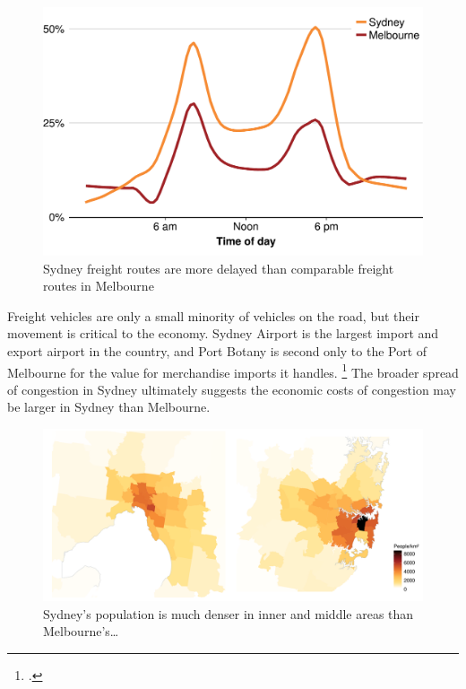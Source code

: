 \documentclass{grattan}
\begin{document}
\begin{figure}
\caption{Sydney freight routes are more delayed than comparable freight routes in Melbourne\label{fig:freight-routes-syd-and-melb}}
\includegraphics{atlas/increase_in_travel_time-vs-time_of_day-by-City--Freight-1.pdf}
\end{figure}

Freight vehicles are only a small minority of vehicles on the road, but their movement is critical to the economy. Sydney Airport is the largest import and export airport in the country, and Port Botany is second only to the Port of Melbourne for the value for merchandise imports it handles.%
   \footcite[][6]{BITRE-2014-Freightline}
The broader spread of congestion in Sydney ultimately suggests the economic costs of congestion may be larger in Sydney than Melbourne.


\begin{figure}
\caption{Sydney's population is much denser in inner and middle areas than Melbourne's\dots{}\label{fig:sydney-vs-melbourne-population-density}}
\includegraphics[width=2.164\columnwidth]{atlas/SYD_MEL_densities-1.pdf}
\end{figure}
\end{document}
